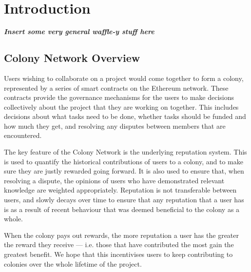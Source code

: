 \section{Introduction}


\textbf{\emph{Insert some very general waffle-y stuff here}}

\subsection{Colony Network Overview}

Users wishing to collaborate on a project would come together to form a colony, represented by a series of smart contracts on the Ethereum network. These contracts provide the governance mechanisms for the users to make decisions collectively about the project that they are working on together. This includes decisions about what tasks need to be done, whether tasks should be funded and how much they get, and resolving any disputes between members that are encountered.

The key feature of the Colony Network is the underlying reputation system. This is used to quantify the historical contributions of users to a colony, and to make sure they are justly rewarded going forward. It is also used to ensure that, when resolving a dispute, the opinions of users who have demonstrated relevant knowledge are weighted appropriately. Reputation is not transferable between users, and slowly decays over time to ensure that any reputation that a user has is as a result of recent behaviour that was deemed beneficial to the colony as a whole.

When the colony pays out rewards, the more reputation a user has the greater the reward they receive --- i.e. those that have contributed the most gain the greatest benefit. We hope that this incentivises users to keep contributing to colonies over the whole lifetime of the project.
